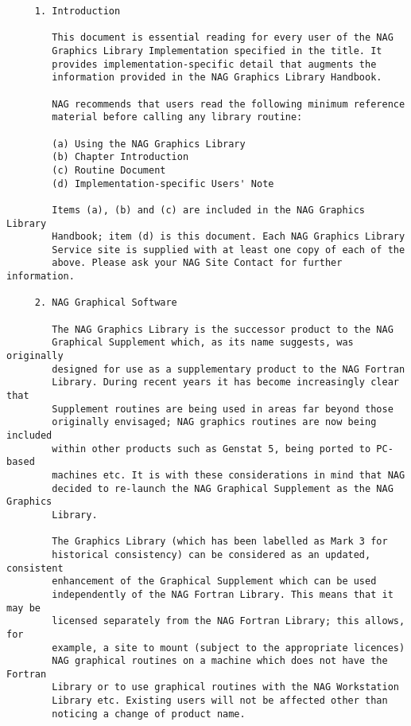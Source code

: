 \begin{verbatim}
     1. Introduction

        This document is essential reading for every user of the NAG
        Graphics Library Implementation specified in the title. It
        provides implementation-specific detail that augments the
        information provided in the NAG Graphics Library Handbook.

        NAG recommends that users read the following minimum reference
        material before calling any library routine:

        (a) Using the NAG Graphics Library
        (b) Chapter Introduction
        (c) Routine Document
        (d) Implementation-specific Users' Note

        Items (a), (b) and (c) are included in the NAG Graphics Library
        Handbook; item (d) is this document. Each NAG Graphics Library
        Service site is supplied with at least one copy of each of the
        above. Please ask your NAG Site Contact for further information.

     2. NAG Graphical Software

        The NAG Graphics Library is the successor product to the NAG
        Graphical Supplement which, as its name suggests, was originally
        designed for use as a supplementary product to the NAG Fortran
        Library. During recent years it has become increasingly clear that
        Supplement routines are being used in areas far beyond those
        originally envisaged; NAG graphics routines are now being included
        within other products such as Genstat 5, being ported to PC-based
        machines etc. It is with these considerations in mind that NAG
        decided to re-launch the NAG Graphical Supplement as the NAG Graphics
        Library.

        The Graphics Library (which has been labelled as Mark 3 for
        historical consistency) can be considered as an updated, consistent
        enhancement of the Graphical Supplement which can be used
        independently of the NAG Fortran Library. This means that it may be
        licensed separately from the NAG Fortran Library; this allows, for
        example, a site to mount (subject to the appropriate licences)
        NAG graphical routines on a machine which does not have the Fortran
        Library or to use graphical routines with the NAG Workstation
        Library etc. Existing users will not be affected other than
        noticing a change of product name.


\end{verbatim}
